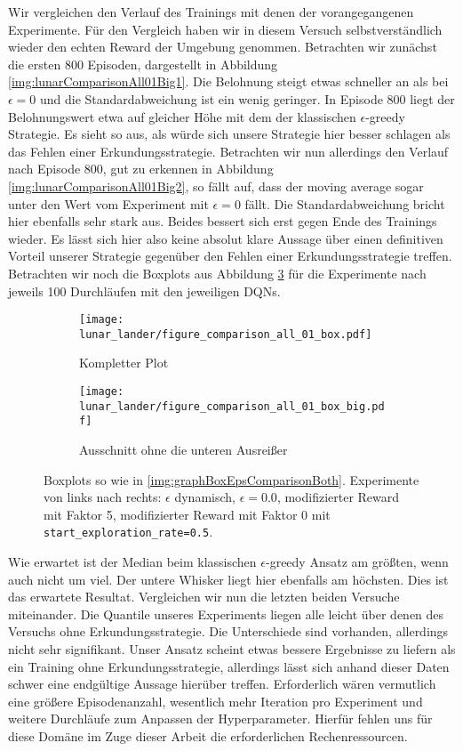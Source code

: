 Wir vergleichen den Verlauf des Trainings mit denen der vorangegangenen Experimente. Für den Vergleich haben wir in diesem Versuch selbstverständlich wieder den echten Reward der Umgebung genommen. Betrachten wir zunächst die ersten 800 Episoden, dargestellt in Abbildung \ref{img:lunarComparisonAll01Big1}. Die Belohnung steigt etwas schneller an als bei $ \epsilon = 0 $ und die Standardabweichung ist ein wenig geringer. In Episode 800 liegt der Belohnungswert etwa auf gleicher Höhe mit dem der klassischen $ \epsilon $-greedy Strategie. Es sieht so aus, als würde sich unsere Strategie hier besser schlagen als das Fehlen einer Erkundungsstrategie. Betrachten wir nun allerdings den Verlauf nach Episode 800, gut zu erkennen in Abbildung \ref{img:lunarComparisonAll01Big2}, so fällt auf, dass der moving average sogar unter den Wert vom Experiment mit $ \epsilon = 0 $ fällt. Die Standardabweichung bricht hier ebenfalls sehr stark aus. Beides bessert sich erst gegen Ende des Trainings wieder. Es lässt sich hier also keine absolut klare Aussage über einen definitiven Vorteil unserer Strategie gegenüber den Fehlen einer Erkundungsstrategie treffen. Betrachten wir noch die Boxplots aus Abbildung \ref{img:lunarComparisonAllBox01Both} für die Experimente nach jeweils 100 Durchläufen mit den jeweiligen DQNs.
\begin{figure}[h!]
    \centering
    \begin{subfigure}[b]{0.7\textwidth}
        \texttt{[image: lunar\_lander/figure\_comparison\_all\_01\_box.pdf]}
        \caption{Kompletter Plot}
        \label{img:lunarComparisonAllBox01}
    \end{subfigure}
    \begin{subfigure}[b]{0.7\textwidth}
        \texttt{[image: lunar\_lander/figure\_comparison\_all\_01\_box\_big.pdf]}
        \caption{Ausschnitt ohne die unteren Ausreißer}
        \label{img:lunarComparisonAllBox01Big}
    \end{subfigure}
    \caption{Boxplots so wie in \ref{img:graphBoxEpsComparisonBoth}. Experimente von links nach rechts: $ \epsilon $ dynamisch, $ \epsilon = 0.0 $, modifizierter Reward mit Faktor 5, modifizierter Reward mit Faktor 0 mit \texttt{start_exploration_rate=0.5}.}
    \label{img:lunarComparisonAllBox01Both}
\end{figure}
Wie erwartet ist der Median beim klassischen $ \epsilon $-greedy Ansatz am größten, wenn auch nicht um viel. Der untere Whisker liegt hier ebenfalls am höchsten. Dies ist das erwartete Resultat. Vergleichen wir nun die letzten beiden Versuche miteinander. Die Quantile unseres Experiments liegen alle leicht über denen des Versuchs ohne Erkundungsstrategie. Die Unterschiede sind vorhanden, allerdings nicht sehr signifikant. Unser Ansatz scheint etwas bessere Ergebnisse zu liefern als ein Training ohne Erkundungsstrategie, allerdings lässt sich anhand dieser Daten schwer eine endgültige Aussage hierüber treffen. Erforderlich wären vermutlich eine größere Episodenanzahl, wesentlich mehr Iteration pro Experiment und weitere Durchläufe zum Anpassen der Hyperparameter. Hierfür fehlen uns für diese Domäne im Zuge dieser Arbeit die erforderlichen Rechenressourcen.

